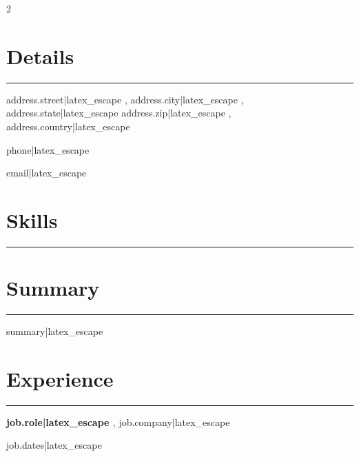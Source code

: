 \documentclass[11pt,a4paper]{article}
\begin{document}
\begin{multicols}{2}

{%
\colorbox{graybg}{%
  \parbox{\dimexpr\columnwidth-2\fboxsep\relax}{%
{%

{%
\section*{Details}
\noindent\rule{\linewidth}{0.4pt}

{%
{{ address.street|latex_escape }}, {{ address.city|latex_escape }}, {{ address.state|latex_escape }} {{ address.zip|latex_escape }}, {{ address.country|latex_escape }}\\[2pt]{%

{%
{{ phone|latex_escape }}\\[2pt]{%

{%
{{ email|latex_escape }}\\[2pt]{%
{%

{%
\section*{Skills}
\noindent\rule{\linewidth}{0.4pt}
{%

{%
  } %
} %
{%

\columnbreak

{%
\section*{Summary}
\noindent\rule{\linewidth}{0.4pt}
{{ summary|latex_escape }}\\[2pt]
{%

{%
\section*{Experience}
\noindent\rule{\linewidth}{0.4pt}
{%
\textbf{ {{ job.role|latex_escape }} }, {{ job.company|latex_escape }} {%
{{ job.dates|latex_escape }}\\
{%
{%
\vspace{8pt}
{%
{%

}}}}}}}}}}}}}}}}}}}}}}}
\end{multicols}
\end{document}
